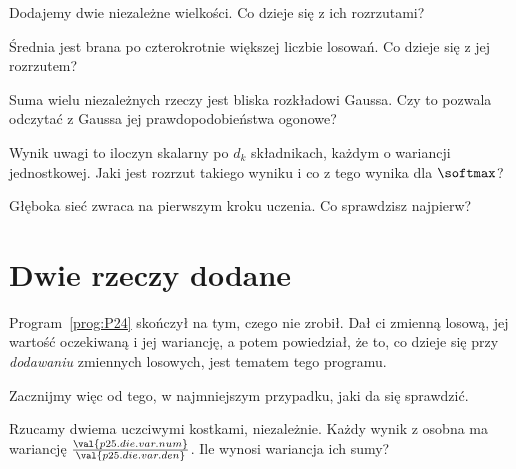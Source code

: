 \begin{quiz}
\item Dodajemy dwie niezależne wielkości. Co dzieje się z ich rozrzutami?
\item Średnia jest brana po czterokrotnie większej liczbie losowań. Co dzieje
  się z jej rozrzutem? 
\item Suma wielu niezależnych rzeczy jest bliska rozkładowi Gaussa. Czy to
  pozwala odczytać z Gaussa jej prawdopodobieństwa ogonowe?
\item Wynik uwagi to iloczyn skalarny po $d_k$ składnikach, każdym o
  wariancji jednostkowej. Jaki jest rozrzut takiego wyniku i co z tego wynika
  dla $\softmax$? 
\item Głęboka sieć zwraca  na pierwszym kroku uczenia. Co
  sprawdzisz najpierw? 
\end{quiz}

\section{Dwie rzeczy dodane}
\label{sec:P25-adding}

\begin{fr}
Program~\ref{prog:P24} skończył na tym, czego nie zrobił. Dał ci zmienną
losową, jej wartość oczekiwaną i jej wariancję, a potem powiedział, że to, co
dzieje się przy \emph{dodawaniu} zmiennych losowych, jest tematem tego
programu.

Zacznijmy więc od tego, w najmniejszym przypadku, jaki da się sprawdzić.

Rzucamy dwiema uczciwymi kostkami, niezależnie. Każdy wynik z osobna ma
wariancję $\frac{\val{p25.die.var.num}}{\val{p25.die.var.den}}$. Ile wynosi
wariancja ich sumy?
\dotline
\nextframe
\end{fr}

